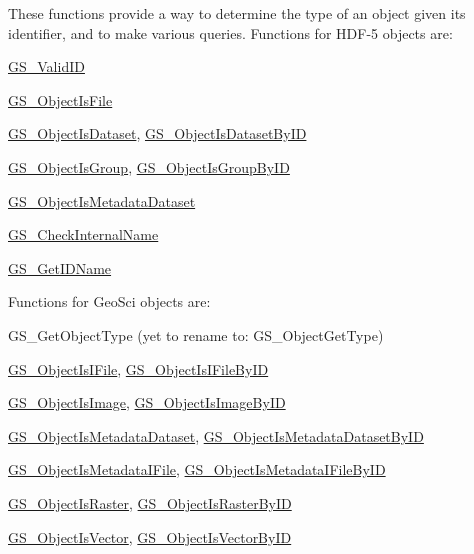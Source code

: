 These functions provide a way to determine the type of an object given its identifier, and to make various queries. Functions for H\+D\+F-\/5 objects are\+: \begin{DoxyItemize}
\item \hyperlink{hdf5mine_8h_a1bde4d83ab42554ee87e41fec520013a}{G\+S\+\_\+\+Valid\+I\+D} \item \hyperlink{hdf5mine_8h_a4cc148d22725e48bb49acd3d5b1c9e16}{G\+S\+\_\+\+Object\+Is\+File} \item \hyperlink{hdf5mine_8h_a1b2f781e43f8ed14a2e8a01b75bc7b1b}{G\+S\+\_\+\+Object\+Is\+Dataset}, \hyperlink{hdf5mine_8h_af5da13687603a1b21692adcdbec3867d}{G\+S\+\_\+\+Object\+Is\+Dataset\+By\+I\+D} \item \hyperlink{hdf5mine_8h_a74581103e0fc4457ecd07ff34e43fc6f}{G\+S\+\_\+\+Object\+Is\+Group}, \hyperlink{hdf5mine_8h_a850cac18e0e2803810b84f0660ae6c8b}{G\+S\+\_\+\+Object\+Is\+Group\+By\+I\+D} \item \hyperlink{hdf5mine_8h_aff81bc6051d0ea48e21b518fbc647147}{G\+S\+\_\+\+Object\+Is\+Metadata\+Dataset} \item \hyperlink{hdf5mine_8h_a68b26302ddaf7ffd9bf946087e682730}{G\+S\+\_\+\+Check\+Internal\+Name} \item \hyperlink{hdf5mine_8h_a7bd4309976609e0329b04d430063b868}{G\+S\+\_\+\+Get\+I\+D\+Name}\end{DoxyItemize}
Functions for Geo\+Sci objects are\+: \begin{DoxyItemize}
\item G\+S\+\_\+\+Get\+Object\+Type (yet to rename to\+: G\+S\+\_\+\+Object\+Get\+Type) \item \hyperlink{hdf5mine_8h_a1cb5a5a9179ebbfd3c6002c2204d88dd}{G\+S\+\_\+\+Object\+Is\+I\+File}, \hyperlink{hdf5mine_8h_a136226148d184e5523c92fcf3d1727d3}{G\+S\+\_\+\+Object\+Is\+I\+File\+By\+I\+D} \item \hyperlink{hdf5mine_8h_GS_ObjectIsImage}{G\+S\+\_\+\+Object\+Is\+Image}, \hyperlink{hdf5mine_8h_GS_ObjectIsImageByID}{G\+S\+\_\+\+Object\+Is\+Image\+By\+I\+D} \item \hyperlink{hdf5mine_8h_aff81bc6051d0ea48e21b518fbc647147}{G\+S\+\_\+\+Object\+Is\+Metadata\+Dataset}, \hyperlink{hdf5mine_8h_ad5a0f5d7f440e47b3bd544ca362dfc95}{G\+S\+\_\+\+Object\+Is\+Metadata\+Dataset\+By\+I\+D} \item \hyperlink{hdf5mine_8h_GS_ObjectIsMetadataIFile}{G\+S\+\_\+\+Object\+Is\+Metadata\+I\+File}, \hyperlink{hdf5mine_8h_GS_ObjectIsMetadataIFileByID}{G\+S\+\_\+\+Object\+Is\+Metadata\+I\+File\+By\+I\+D} \item \hyperlink{hdf5mine_8h_GS_ObjectIsRaster}{G\+S\+\_\+\+Object\+Is\+Raster}, \hyperlink{hdf5mine_8h_GS_ObjectIsRasterByID}{G\+S\+\_\+\+Object\+Is\+Raster\+By\+I\+D} \item \hyperlink{hdf5mine_8h_GS_ObjectIsVector}{G\+S\+\_\+\+Object\+Is\+Vector}, \hyperlink{hdf5mine_8h_GS_ObjectIsVectorByID}{G\+S\+\_\+\+Object\+Is\+Vector\+By\+I\+D}\end{DoxyItemize}
